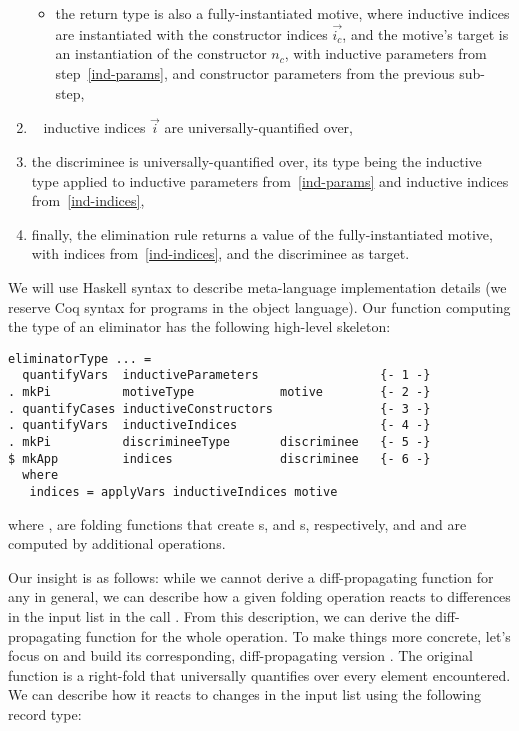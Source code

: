\begin{enumerate}
\begin{itemize}
\item the return type is also a fully-instantiated motive, where inductive
indices are instantiated with the constructor indices $\overrightarrow{i_c}$,
and the motive's target is an instantiation of the constructor $n_c$, with
inductive parameters from step~\ref{ind-params}, and constructor parameters from
the previous sub-step,

\end{itemize}

\item~\label{ind-indices} inductive indices $\overrightarrow{i}$ are
universally-quantified over,

\item the discriminee is universally-quantified over, its type being the
inductive type applied to inductive parameters from~\ref{ind-params} and
inductive indices from~\ref{ind-indices},

\item finally, the elimination rule returns a value of the fully-instantiated
motive, with indices from~\ref{ind-indices}, and the discriminee as target.

\end{enumerate}
%
We will use Haskell syntax to describe meta-language implementation details (we
reserve Coq syntax for programs in the object language).  Our function computing
the type of an eliminator has the following high-level skeleton:

\noindent
\begin{minipage}{\textwidth}
\begin{verbatim}
eliminatorType ... =
  quantifyVars  inductiveParameters                 {- 1 -}
. mkPi          motiveType            motive        {- 2 -}
. quantifyCases inductiveConstructors               {- 3 -}
. quantifyVars  inductiveIndices                    {- 4 -}
. mkPi          discrimineeType       discriminee   {- 5 -}
$ mkApp         indices               discriminee   {- 6 -}
  where
   indices = applyVars inductiveIndices motive
\end{verbatim}
\end{minipage}

\noindent where ,  are
folding functions that create s, and s,
respectively, and  and  are
computed by additional  operations.

Our insight is as follows: while we cannot derive a diff-propagating function
for any  in general, we can describe how a given folding
operation  reacts to differences in the input list  in
the call .  From this description, we can derive the
diff-propagating function for the whole  operation.  To make
things more concrete, let's focus on  and build
its corresponding, diff-propagating version .
The original function is a right-fold that universally quantifies over every
element encountered. We can describe how it reacts to changes in the input list
using the following record type:

